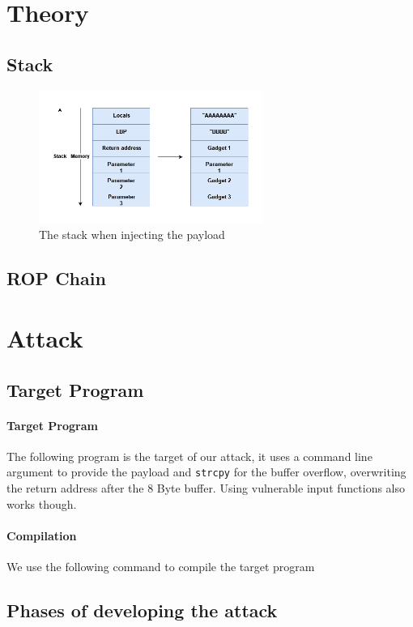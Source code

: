 \documentclass[journal=tosc,submission]{iacrtrans}
\begin{document}
\section{Theory}
\subsection{Stack}
\begin{figure}[h]
  \centering
  \includegraphics[width=0.65\textwidth]{stackropoffsec.png}
  \caption{The stack when injecting the payload}
  \label{fig:mesh1}
\end{figure}
\subsection{ROP Chain}
\section{Attack}
\subsection{Target Program}
\paragraph{Target Program}
The following program is the target of our attack, it uses a command line argument to provide the payload and \Verb+strcpy+ for the buffer overflow, overwriting the return address after the 8 Byte buffer. Using vulnerable input functions also works though.

\paragraph{Compilation}
We use the following command to compile the target program

\subsection{Phases of developing the attack}
\end{document}
